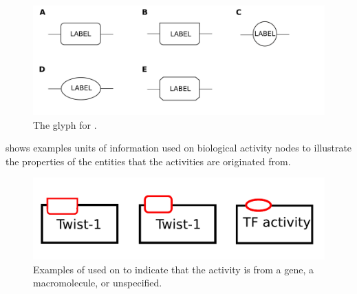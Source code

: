 \begin{figure}[H]
  \centering
  \includegraphics[scale = 0.2]{images/unitInformation}
  \caption{The \AF glyph for .}
  \label{fig:af:unitInfo}
\end{figure}

 shows examples units of information used on biological activity nodes to illustrate the properties of the entities that the activities are originated from.

\begin{figure}[H]
  \centering
  \includegraphics[scale = 0.5]{examples/unitofinformation}
  \caption{Examples of  used on  to indicate that the activity is from a gene, a macromolecule, or unspecified.}
  \label{fig:af:unitofinfo}
\end{figure}

